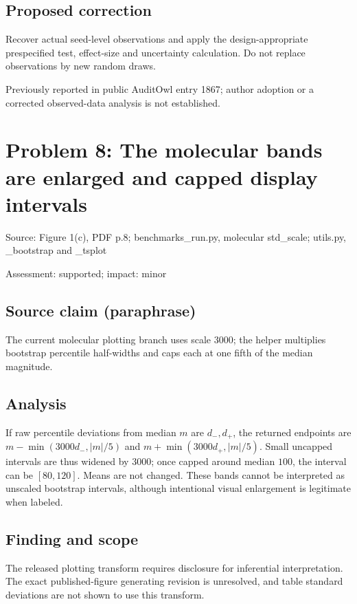 \documentclass[11pt]{article}
\begin{document}
\subsection*{Proposed correction}

Recover actual seed-level observations and apply the design-appropriate prespecified test, effect-size and uncertainty calculation. Do not replace observations by new random draws.

Previously reported in public AuditOwl entry 1867; author adoption or a corrected observed-data analysis is not established.

\section*{Problem 8: The molecular bands are enlarged and capped display intervals}

Source: Figure 1(c), PDF p.8; benchmarks\_run.py, molecular std\_scale; utils.py, \_bootstrap and \_tsplot

Assessment: supported; impact: minor

\subsection*{Source claim (paraphrase)}

The current molecular plotting branch uses scale \(3000\); the helper multiplies bootstrap percentile half-widths and caps each at one fifth of the median magnitude.

\subsection*{Analysis}

If raw percentile deviations from median \(m\) are \(d_-,d_+\), the returned endpoints are \(m-\min(3000d_-,|m|/5)\) and \(m+\min(3000d_+,|m|/5)\). Small uncapped intervals are thus widened by \(3000\); once capped around median \(100\), the interval can be \([80,120]\). Means are not changed. These bands cannot be interpreted as unscaled bootstrap intervals, although intentional visual enlargement is legitimate when labeled.

\subsection*{Finding and scope}

The released plotting transform requires disclosure for inferential interpretation. The exact published-figure generating revision is unresolved, and table standard deviations are not shown to use this transform.
\end{document}
